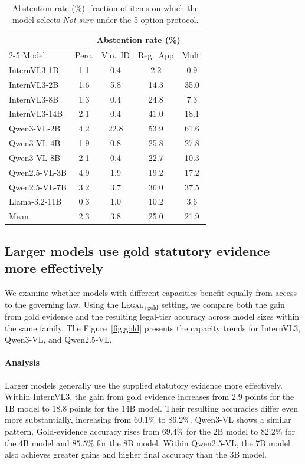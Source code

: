 \begin{table}[t]
\centering
\small
\setlength{\tabcolsep}{5pt}
\begin{tabular}{lcccc}
\toprule
& \multicolumn{4}{c}{Abstention rate (\%)} \\
\cmidrule(lr){2-5}
Model & Perc. & Vio.\ ID & Reg.\ App & Multi \\
\midrule
InternVL3-1B    & 1.1 & \phantom{0}0.4 & \phantom{0}2.2 & \phantom{0}0.9 \\
InternVL3-2B    & 1.6 & \phantom{0}5.8 & 14.3 & 35.0 \\
InternVL3-8B    & 1.3 & \phantom{0}0.4 & 24.8 & \phantom{0}7.3 \\
InternVL3-14B   & 2.1 & \phantom{0}0.4 & 41.0 & 18.1 \\
Qwen3-VL-2B     & 4.2 & 22.8 & 53.9 & 61.6 \\
Qwen3-VL-4B     & 1.9 & \phantom{0}0.8 & 25.8 & 27.8 \\
Qwen3-VL-8B     & 2.1 & \phantom{0}0.4 & 22.7 & 10.3 \\
Qwen2.5-VL-3B   & 4.9 & \phantom{0}1.9 & 19.2 & 17.2 \\
Qwen2.5-VL-7B   & 3.2 & \phantom{0}3.7 & 36.0 & 37.5 \\
Llama-3.2-11B   & 0.3 & \phantom{0}1.0 & 10.2 & \phantom{0}3.6 \\
\midrule
Mean            & 2.3 & \phantom{0}3.8 & 25.0 & 21.9 \\
\bottomrule
\end{tabular}
\caption{Abstention rate (\%): fraction of items on which the model selects
\emph{Not sure} under the 5-option protocol.}
\label{tab:abstention}
\end{table}

\subsection{Larger models use gold statutory evidence more effectively}
\label{sec:small}
We examine whether models with different capacities benefit equally from access to the governing law. Using the \textsc{Legal}$_{+\text{gold}}$ setting, we compare both the gain from gold evidence and the resulting legal-tier accuracy across model sizes within the same family. The Figure~\ref{fig:gold} presents the capacity trends for InternVL3, Qwen3-VL, and Qwen2.5-VL.

\paragraph{Analysis}
Larger models generally use the supplied statutory evidence more effectively. Within InternVL3, the gain from gold evidence increases from $2.9$ points for the 1B model to $18.8$ points for the 14B model. Their resulting accuracies differ even more substantially, increasing from $60.1\%$ to $86.2\%$. Qwen3-VL shows a similar pattern. Gold-evidence accuracy rises from $69.4\%$ for the 2B model to $82.2\%$ for the 4B model and $85.5\%$ for the 8B model. Within Qwen2.5-VL, the 7B model also achieves greater gains and higher final accuracy than the 3B model.

